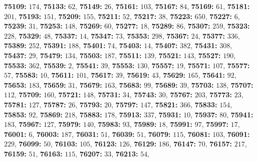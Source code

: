 \textsf{\bfseries 75109:} $174$, \textsf{\bfseries 75133:} $62$, \textsf{\bfseries 75149:} $26$, \textsf{\bfseries 75161:} $103$, \textsf{\bfseries 75167:} $84$, \textsf{\bfseries 75169:} $61$, \textsf{\bfseries 75181:} $201$, \textsf{\bfseries 75193:} $151$, \textsf{\bfseries 75209:} $155$, \textsf{\bfseries 75211:} $52$, \textsf{\bfseries 75217:} $38$, \textsf{\bfseries 75223:} $650$, \textsf{\bfseries 75227:} $6$, \textsf{\bfseries 75239:} $31$, \textsf{\bfseries 75253:} $148$, \textsf{\bfseries 75269:} $60$, \textsf{\bfseries 75277:} $18$, \textsf{\bfseries 75289:} $86$, \textsf{\bfseries 75307:} $259$, \textsf{\bfseries 75323:} $228$, \textsf{\bfseries 75329:} $48$, \textsf{\bfseries 75337:} $14$, \textsf{\bfseries 75347:} $73$, \textsf{\bfseries 75353:} $298$, \textsf{\bfseries 75367:} $24$, \textsf{\bfseries 75377:} $336$, \textsf{\bfseries 75389:} $252$, \textsf{\bfseries 75391:} $188$, \textsf{\bfseries 75401:} $74$, \textsf{\bfseries 75403:} $14$, \textsf{\bfseries 75407:} $382$, \textsf{\bfseries 75431:} $308$, \textsf{\bfseries 75437:} $29$, \textsf{\bfseries 75479:} $134$, \textsf{\bfseries 75503:} $187$, \textsf{\bfseries 75511:} $139$, \textsf{\bfseries 75521:} $143$, \textsf{\bfseries 75527:} $190$, \textsf{\bfseries 75533:} $362$, \textsf{\bfseries 75539:} $2$, \textsf{\bfseries 75541:} $39$, \textsf{\bfseries 75553:} $130$, \textsf{\bfseries 75557:} $19$, \textsf{\bfseries 75571:} $107$, \textsf{\bfseries 75577:} $57$, \textsf{\bfseries 75583:} $10$, \textsf{\bfseries 75611:} $101$, \textsf{\bfseries 75617:} $39$, \textsf{\bfseries 75619:} $43$, \textsf{\bfseries 75629:} $165$, \textsf{\bfseries 75641:} $92$, \textsf{\bfseries 75653:} $183$, \textsf{\bfseries 75659:} $31$, \textsf{\bfseries 75679:} $163$, \textsf{\bfseries 75683:} $99$, \textsf{\bfseries 75689:} $39$, \textsf{\bfseries 75703:} $138$, \textsf{\bfseries 75707:} $112$, \textsf{\bfseries 75709:} $160$, \textsf{\bfseries 75721:} $148$, \textsf{\bfseries 75731:} $34$, \textsf{\bfseries 75743:} $30$, \textsf{\bfseries 75767:} $203$, \textsf{\bfseries 75773:} $23$, \textsf{\bfseries 75781:} $127$, \textsf{\bfseries 75787:} $26$, \textsf{\bfseries 75793:} $20$, \textsf{\bfseries 75797:} $147$, \textsf{\bfseries 75821:} $366$, \textsf{\bfseries 75833:} $154$, \textsf{\bfseries 75853:} $92$, \textsf{\bfseries 75869:} $218$, \textsf{\bfseries 75883:} $178$, \textsf{\bfseries 75913:} $337$, \textsf{\bfseries 75931:} $10$, \textsf{\bfseries 75937:} $80$, \textsf{\bfseries 75941:} $183$, \textsf{\bfseries 75967:} $127$, \textsf{\bfseries 75979:} $140$, \textsf{\bfseries 75983:} $93$, \textsf{\bfseries 75989:} $18$, \textsf{\bfseries 75991:} $97$, \textsf{\bfseries 75997:} $17$, \textsf{\bfseries 76001:} $6$, \textsf{\bfseries 76003:} $187$, \textsf{\bfseries 76031:} $51$, \textsf{\bfseries 76039:} $51$, \textsf{\bfseries 76079:} $115$, \textsf{\bfseries 76081:} $103$, \textsf{\bfseries 76091:} $229$, \textsf{\bfseries 76099:} $50$, \textsf{\bfseries 76103:} $105$, \textsf{\bfseries 76123:} $126$, \textsf{\bfseries 76129:} $186$, \textsf{\bfseries 76147:} $70$, \textsf{\bfseries 76157:} $217$, \textsf{\bfseries 76159:} $51$, \textsf{\bfseries 76163:} $115$, \textsf{\bfseries 76207:} $33$, \textsf{\bfseries 76213:} $54$, 
